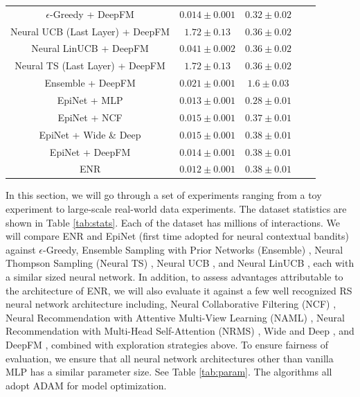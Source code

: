\begin{table}[t!]
\begin{tabular}{ccccc}
    \midrule
    $\epsilon$-Greedy + DeepFM & $0.014 \pm 0.001$ & $0.32 \pm 0.02$\\
    Neural UCB (Last Layer) + DeepFM & $1.72 \pm 0.13$ & $0.36 \pm 0.02$\\
    Neural LinUCB + DeepFM & $0.041 \pm 0.002$ & $0.36 \pm 0.02$\\
    Neural TS (Last Layer) + DeepFM & $1.72 \pm 0.13$ & $0.36 \pm 0.02$\\
    Ensemble + DeepFM & $0.021 \pm 0.001$ & $1.6 \pm 0.03$\\
    \midrule\midrule
    EpiNet + MLP & $0.013 \pm 0.001$ & $0.28 \pm 0.01$\\
    EpiNet + NCF & $0.015 \pm 0.001$ & $0.37 \pm 0.01$\\
    EpiNet + Wide \& Deep & $0.015 \pm 0.001$ & $0.38 \pm 0.01$\\
    EpiNet + DeepFM & $0.014 \pm 0.001$ & $0.38 \pm 0.01$\\
    \midrule
    ENR & $0.012 \pm 0.001$ & $0.38 \pm 0.01$\\
  \bottomrule
\end{tabular}
\vspace{-0.1in}
\end{table}

In this section, we will go through a set of experiments ranging from a toy experiment to large-scale real-world data experiments. The dataset statistics are shown in Table \ref{tab:stats}. Each of the dataset has millions of interactions. We will compare ENR and EpiNet \cite{osband2021epistemic} (first time adopted for neural contextual bandits) against $\epsilon$-Greedy, Ensemble Sampling with Prior Networks (Ensemble) \cite{lu2017ensemble}, Neural Thompson Sampling (Neural TS) \cite{zhang2021neural}, Neural UCB \cite{zhou2020neural}, and Neural LinUCB \cite{xu2021neural}, each with a similar sized neural network. In addition, to assess advantages attributable to the architecture of ENR, we will also evaluate it against a few well recognized RS neural network architecture including, Neural Collaborative Filtering (NCF) \cite{he2017neural}, Neural Recommendation with Attentive Multi-View Learning (NAML) \cite{wu2019naml}, Neural Recommendation with Multi-Head Self-Attention (NRMS) \cite{wu2019neural}, Wide and Deep \cite{cheng2016wide}, and DeepFM \cite{guo2017deepfm}, combined with exploration strategies above. To ensure fairness of evaluation, we ensure that all neural network architectures other than vanilla MLP has a similar parameter size. See Table \ref{tab:param}. The algorithms all adopt ADAM \cite{kingma2015adam} for model optimization.  


